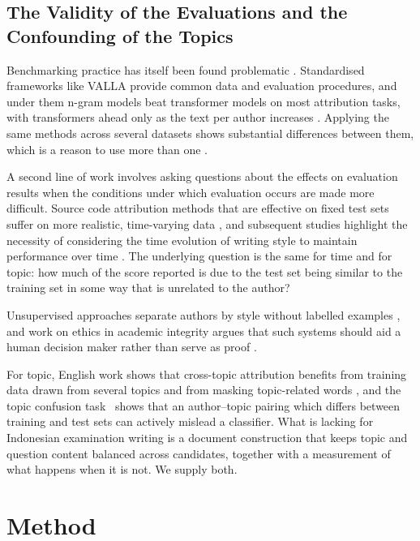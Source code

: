 \documentclass[runningheads]{llncs}
\begin{document}
\subsection{The Validity of the Evaluations and the Confounding of the Topics}
\label{sec:validity}

Benchmarking practice has itself been found problematic \cite{Tyo2022,Murauer2021}. Standardised frameworks like VALLA provide common data and evaluation procedures, and under them n-gram models beat transformer models on most attribution tasks, with transformers ahead only as the text per author increases \cite{Tyo2022}. Applying the same methods across several datasets shows substantial differences between them, which is a reason to use more than one \cite{Murauer2021}.

A second line of work involves asking questions about the effects on evaluation results when the conditions under which evaluation occurs are made more difficult. Source code attribution methods that are effective on fixed test sets suffer on more realistic, time-varying data \cite{Bogomolov2021}, and subsequent studies highlight the necessity of considering the time evolution of writing style to maintain performance over time \cite{Li2024}. The underlying question is the same for time and for topic: how much of the score reported is due to the test set being similar to the training set in some way that is unrelated to the author?

Unsupervised approaches separate authors by style without labelled examples \cite{Bertocco2023}, and work on ethics in academic integrity argues that such systems should aid a human decision maker rather than serve as proof \cite{Saxena2025}.

For topic, English work shows that cross-topic attribution benefits from training data drawn from several topics \cite{Sapkota2014} and from masking topic-related words \cite{Stamatatos2018}, and the topic confusion task~\cite{Altakrori2021} shows that an author--topic pairing which differs between training and test sets can actively mislead a classifier. What is lacking for Indonesian examination writing is a document construction that keeps topic and question content balanced across candidates, together with a measurement of what happens when it is not. We supply both.

\section{Method}
\end{document}
